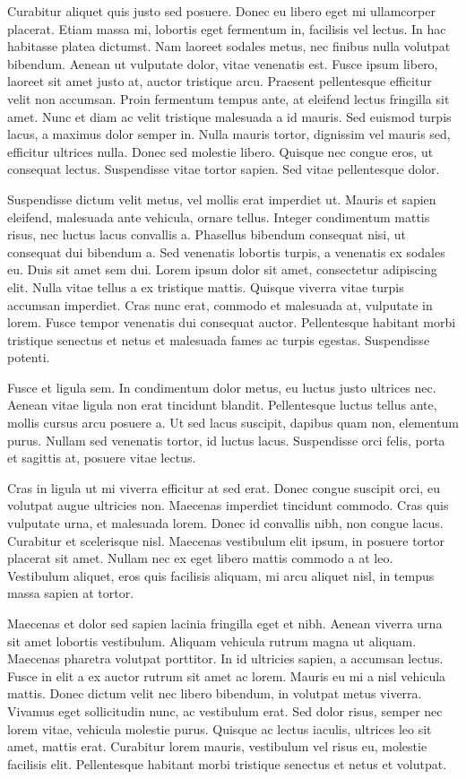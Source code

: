 Curabitur aliquet quis justo sed posuere. Donec eu libero eget mi ullamcorper placerat. Etiam massa mi, lobortis eget fermentum in, facilisis vel lectus. In hac habitasse platea dictumst. Nam laoreet sodales metus, nec finibus nulla volutpat bibendum. Aenean ut vulputate dolor, vitae venenatis est. Fusce ipsum libero, laoreet sit amet justo at, auctor tristique arcu. Praesent pellentesque efficitur velit non accumsan. Proin fermentum tempus ante, at eleifend lectus fringilla sit amet. Nunc et diam ac velit tristique malesuada a id mauris. Sed euismod turpis lacus, a maximus dolor semper in. Nulla mauris tortor, dignissim vel mauris sed, efficitur ultrices nulla. Donec sed molestie libero. Quisque nec congue eros, ut consequat lectus. Suspendisse vitae tortor sapien. Sed vitae pellentesque dolor.

Suspendisse dictum velit metus, vel mollis erat imperdiet ut. Mauris et sapien eleifend, malesuada ante vehicula, ornare tellus. Integer condimentum mattis risus, nec luctus lacus convallis a. Phasellus bibendum consequat nisi, ut consequat dui bibendum a. Sed venenatis lobortis turpis, a venenatis ex sodales eu. Duis sit amet sem dui. Lorem ipsum dolor sit amet, consectetur adipiscing elit. Nulla vitae tellus a ex tristique mattis. Quisque viverra vitae turpis accumsan imperdiet. Cras nunc erat, commodo et malesuada at, vulputate in lorem. Fusce tempor venenatis dui consequat auctor. Pellentesque habitant morbi tristique senectus et netus et malesuada fames ac turpis egestas. Suspendisse potenti.

Fusce et ligula sem. In condimentum dolor metus, eu luctus justo ultrices nec. Aenean vitae ligula non erat tincidunt blandit. Pellentesque luctus tellus ante, mollis cursus arcu posuere a. Ut sed lacus suscipit, dapibus quam non, elementum purus. Nullam sed venenatis tortor, id luctus lacus. Suspendisse orci felis, porta et sagittis at, posuere vitae lectus.

Cras in ligula ut mi viverra efficitur at sed erat. Donec congue suscipit orci, eu volutpat augue ultricies non. Maecenas imperdiet tincidunt commodo. Cras quis vulputate urna, et malesuada lorem. Donec id convallis nibh, non congue lacus. Curabitur et scelerisque nisl. Maecenas vestibulum elit ipsum, in posuere tortor placerat sit amet. Nullam nec ex eget libero mattis commodo a at leo. Vestibulum aliquet, eros quis facilisis aliquam, mi arcu aliquet nisl, in tempus massa sapien at tortor.

Maecenas et dolor sed sapien lacinia fringilla eget et nibh. Aenean viverra urna sit amet lobortis vestibulum. Aliquam vehicula rutrum magna ut aliquam. Maecenas pharetra volutpat porttitor. In id ultricies sapien, a accumsan lectus. Fusce in elit a ex auctor rutrum sit amet ac lorem. Mauris eu mi a nisl vehicula mattis. Donec dictum velit nec libero bibendum, in volutpat metus viverra. Vivamus eget sollicitudin nunc, ac vestibulum erat. Sed dolor risus, semper nec lorem vitae, vehicula molestie purus. Quisque ac lectus iaculis, ultrices leo sit amet, mattis erat. Curabitur lorem mauris, vestibulum vel risus eu, molestie facilisis elit. Pellentesque habitant morbi tristique senectus et netus et volutpat.
